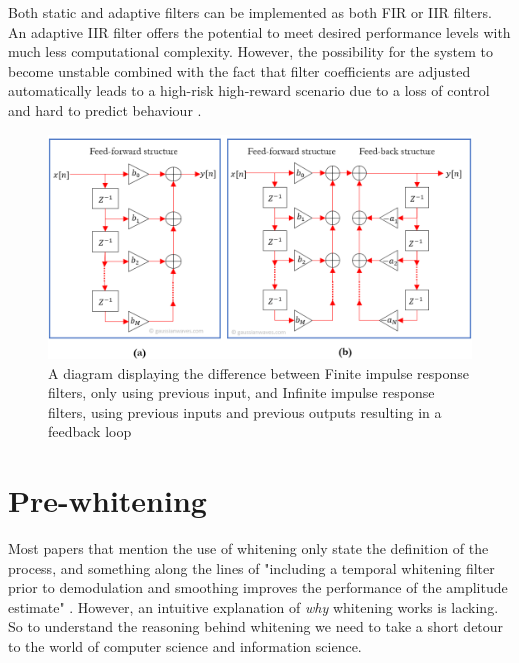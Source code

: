 Both static and adaptive filters can be implemented as both FIR or IIR filters. An adaptive IIR filter offers the potential to meet desired performance levels with much less computational complexity. However, the possibility for the system to become unstable combined with the fact that filter coefficients are adjusted automatically leads to a high-risk high-reward scenario due to a loss of control and hard to predict behaviour \cite{digital_signal_processing_handbook}.

\begin{figure}[h!t]
	\begin{center}
		\includegraphics[width=1.0\columnwidth]{images/fir_vs_iir_diagram.png}
	\end{center}
	\caption{A diagram displaying the difference between Finite impulse response filters, only using previous input, and Infinite impulse response filters, using previous inputs and previous outputs resulting in a feedback loop \cite{fir_vs_iir_diagram}}
	\label{fig:fir_vs_iir_diagram}
\end{figure}


\section{Pre-whitening}
Most  papers that mention the use of whitening only state the definition of the process, and something along the lines of "including a temporal whitening filter prior to demodulation and smoothing improves the performance of the amplitude estimate" \cite{single_site_emg_amplitude_estimation}\cite{adaptive_whitening}\cite{emg_whitening}. However, an intuitive explanation of \textit{why} whitening works is lacking. So to understand the reasoning behind whitening we need to take a short detour to the world of computer science and information science.

